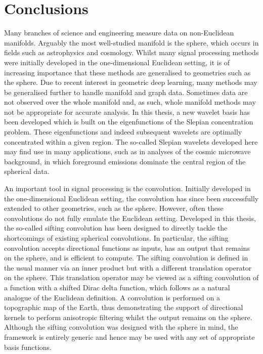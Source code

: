 \chapter{Conclusions}\label{sec:chapter6}

Many branches of science and engineering measure data on non-Euclidean manifolds.
Arguably the most well-studied manifold is the sphere, which occurs in fields such as astrophysics and cosmology.
Whilst many signal processing methods were initially developed in the one-dimensional Euclidean setting, it is of increasing importance that these methods are generalised to geometries such as the sphere.
Due to recent interest in geometric deep learning, many methods may be generalised further to handle manifold and graph data.
Sometimes data are not observed over the whole manifold and, as such, whole manifold methods may not be appropriate for accurate analysis.
In this thesis, a new wavelet basis has been developed which is built on the eigenfunctions of the Slepian concentration problem.
These eigenfunctions and indeed subsequent wavelets are optimally concentrated within a given region.
The so-called Slepian wavelets developed here may find use in many applications, such as in analyses of the cosmic microwave background, in which foreground emissions dominate the central region of the spherical data.

An important tool in signal processing is the convolution.
Initially developed in the one-dimensional Euclidean setting, the convolution has since been successfully extended to other geometries, such as the sphere.
However, often these convolutions do not fully emulate the Euclidean setting.
Developed in this thesis, the so-called sifting convolution has been designed to directly tackle the shortcomings of existing spherical convolutions.
In particular, the sifting convolution accepts directional functions as inputs, has an output that remains on the sphere, and is efficient to compute.
The sifting convolution is defined in the usual manner via an inner product but with a different translation operator on the sphere.
This translation operator may be viewed as a sifting convolution of a function with a shifted Dirac delta function, which follows as a natural analogue of the Euclidean definition.
A convolution is performed on a topographic map of the Earth, thus demonstrating the support of directional kernels to perform anisotropic filtering whilst the output remains on the sphere.
Although the sifting convolution was designed with the sphere in mind, the framework is entirely generic and hence may be used with any set of appropriate basis functions.

